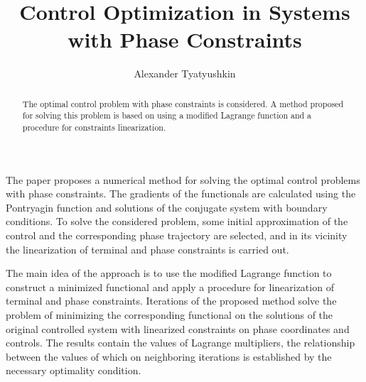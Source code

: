 \documentclass[12pt]{llncs}
\begin{document}
%
\fi
\title{Control Optimization in Systems \\with Phase Constraints	%
}
\author{Alexander Tyatyushkin%
}

\maketitle

\begin{abstract}
The optimal control problem with phase constraints is considered. A method proposed for solving this problem is based on using a modified Lagrange function and a procedure for constraints linearization.

\end{abstract}
The paper proposes a numerical method for solving the optimal control problems with phase constraints. The gradients of the functionals are calculated using the Pontryagin function and solutions of the conjugate system with boundary conditions. To solve the considered problem, some initial approximation of the control and the corresponding phase trajectory are selected, and in its vicinity the linearization of terminal and phase constraints is carried out.

The main idea of the approach is to use the modified Lagrange function to construct a minimized functional and apply a procedure for linearization of terminal and phase constraints. Iterations of the proposed method solve the problem of minimizing the corresponding functional on the solutions of the original controlled system with linearized constraints on phase coordinates and controls. The results contain the values of Lagrange multipliers, the relationship between the values of which on neighboring iterations is established by the necessary optimality condition.
\end{document}
